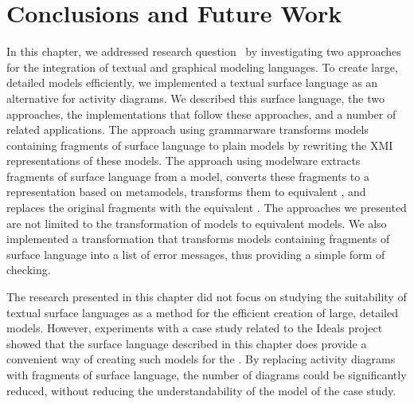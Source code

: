 \section{Conclusions and Future Work}
\label{sec:grammars-and-metamodels:Conclusions-and-Future}

In this chapter, we addressed research question~ by investigating two approaches for the integration of textual and graphical modeling languages.
To create large, detailed \UML models efficiently, we implemented a textual surface language as an alternative for activity diagrams.
We described this surface language, the two approaches, the implementations that follow these approaches, and a number of related applications.
The approach using grammarware transforms models containing fragments of surface language to plain models by rewriting the XMI representations of these models.
The approach using modelware extracts fragments of surface language from a model, converts these fragments to a representation based on metamodels, transforms them to equivalent \Activities, and replaces the original fragments with the equivalent \Activities.
The approaches we presented are not limited to the transformation of models to equivalent models.
We also implemented a transformation that transforms models containing fragments of surface language into a list of error messages, thus providing a simple form of checking.

The research presented in this chapter did not focus on studying the suitability of textual surface languages as a method for the efficient creation of large, detailed models.
However, experiments with a case study related to the Ideals project~\cite{Ideals2007} showed that the surface language described in this chapter does provide a convenient way of creating such models for the \UML.
By replacing activity diagrams with fragments of surface language, the number of diagrams could be significantly reduced, without reducing the understandability of the model of the case study.

